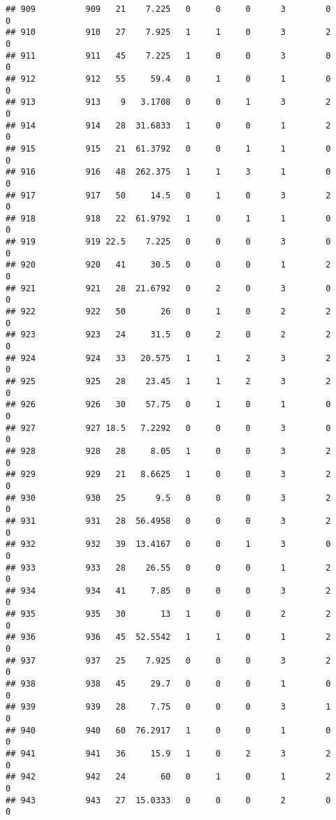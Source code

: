 \documentclass[
]{article}
\begin{document}
\begin{verbatim}
## 909          909   21    7.225   0     0     0      3        0         0
## 910          910   27    7.925   1     1     0      3        2         0
## 911          911   45    7.225   1     0     0      3        0         0
## 912          912   55     59.4   0     1     0      1        0         0
## 913          913    9   3.1708   0     0     1      3        2         0
## 914          914   28  31.6833   1     0     0      1        2         0
## 915          915   21  61.3792   0     0     1      1        0         0
## 916          916   48  262.375   1     1     3      1        0         0
## 917          917   50     14.5   0     1     0      3        2         0
## 918          918   22  61.9792   1     0     1      1        0         0
## 919          919 22.5    7.225   0     0     0      3        0         0
## 920          920   41     30.5   0     0     0      1        2         0
## 921          921   28  21.6792   0     2     0      3        0         0
## 922          922   50       26   0     1     0      2        2         0
## 923          923   24     31.5   0     2     0      2        2         0
## 924          924   33   20.575   1     1     2      3        2         0
## 925          925   28    23.45   1     1     2      3        2         0
## 926          926   30    57.75   0     1     0      1        0         0
## 927          927 18.5   7.2292   0     0     0      3        0         0
## 928          928   28     8.05   1     0     0      3        2         0
## 929          929   21   8.6625   1     0     0      3        2         0
## 930          930   25      9.5   0     0     0      3        2         0
## 931          931   28  56.4958   0     0     0      3        2         0
## 932          932   39  13.4167   0     0     1      3        0         0
## 933          933   28    26.55   0     0     0      1        2         0
## 934          934   41     7.85   0     0     0      3        2         0
## 935          935   30       13   1     0     0      2        2         0
## 936          936   45  52.5542   1     1     0      1        2         0
## 937          937   25    7.925   0     0     0      3        2         0
## 938          938   45     29.7   0     0     0      1        0         0
## 939          939   28     7.75   0     0     0      3        1         0
## 940          940   60  76.2917   1     0     0      1        0         0
## 941          941   36     15.9   1     0     2      3        2         0
## 942          942   24       60   0     1     0      1        2         0
## 943          943   27  15.0333   0     0     0      2        0         0

\end{verbatim}
\end{document}
